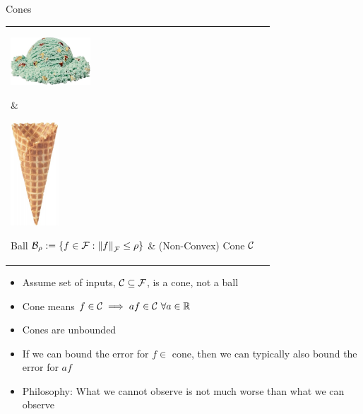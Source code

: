\documentclass[11pt,compress,xcolor={usenames,dvipsnames},aspectratio=169]{beamer}
\newcommand{\scoop}[1]{\parbox{#1}{\includegraphics[width=#1]{IceCreamScoop.eps}}\xspace}
\newcommand{\largescoop}{\scoop{3cm}}
\newcommand{\ICcone}[1]{\parbox{#1}{\includegraphics[width=#1,angle=270]{MediumWaffleCone.eps}}\xspace}
\newcommand{\largecone}{\ICcone{1.8cm}}
\begin{document}
\begin{frame}[label = ConeFrame]{Cones}
\vspace{-4ex}
\begin{tabular}{>{\centering}m{}@{\qquad}>{\centering}m{}}
     \largescoop \hspace{-3cm}\raisebox{-4ex}{\color{red}\fontsize{100}{120}\selectfont $\times$} & 
      \largecone \tabularnewline
      Ball $\cb_{\rho} := \{f \in \cf : \norm[\cf]{f} \le \rho \}$ &
      \hspace{2cm} (Non-Convex) Cone $\cc$
\end{tabular}

\begin{itemize}
    \item Assume set of inputs, $\cc \subseteq \cf$, is a \alert{cone}, not a ball
    
    \item \alert{Cone} means $f \in \cc \implies af \in \cc \ \forall a \in \reals$
    
    \item \alert{Cones} are unbounded
    
    \item If we can bound the error for $f \in $ \alert{cone}, then we can typically also bound the error  for $af$
    
    
    \item Philosophy:  \alert{What we cannot observe is not much worse than what we can observe}
    
\end{itemize}

    
\end{frame}
\end{document}
